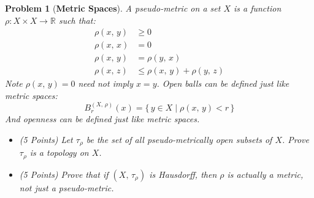 \documentclass{article}
\theoremstyle{normal}
\newtheorem{problem}{Problem}
\begin{document}
    \begin{problem}[\textbf{Metric Spaces}]
        \par\hfill\par
        A pseudo-metric on a set $X$ is a function
        $\rho:X\times{X}\rightarrow\mathbb{R}$ such that:
        \begin{align}
            \rho(x,\,y)&\geq{0}\tag{Positivity}\\
            \rho(x,\,x)&=0\tag{Definite}\\
            \rho(x,\,y)&=\rho(y,\,x)\tag{Symmetry}\\
            \rho(x,\,z)&\leq\rho(x,\,y)+\rho(y,\,z)
                \tag{Triangle-Inequality}
        \end{align}
        Note $\rho(x,\,y)=0$ need not imply $x=y$. Open balls can be defined
        just like metric spaces:
        \begin{equation}
            B_{r}^{(X,\,\rho)}(x)=\{\,y\in{X}\;|\;\rho(x,\,y)<r\,\}
        \end{equation}
        And openness can be defined just like metric spaces.
        \begin{itemize}
            \item (5 Points) Let $\tau_{\rho}$ be the set of all
                pseudo-metrically open subsets of $X$. Prove $\tau_{\rho}$ is
                a topology on $X$.
            \item (5 Points) Prove that if $(X,\,\tau_{\rho})$ is Hausdorff,
                then $\rho$ is actually a metric, not just a pseudo-metric.
        \end{itemize}
    \end{problem}
\end{document}
